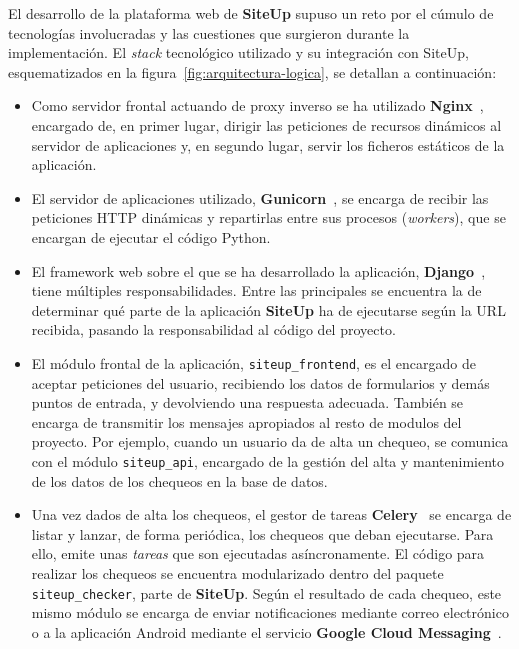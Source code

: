 \documentclass[a4paper,12pt]{article}
\begin{document}
El desarrollo de la plataforma web de \textbf{SiteUp} supuso un reto por el
cúmulo de tecnologías involucradas y las cuestiones que surgieron durante la
implementación. El \textit{stack} tecnológico utilizado y su integración con
SiteUp, esquematizados en la figura~\ref{fig:arquitectura-logica}, se detallan a
continuación:

\begin{itemize}
\item Como servidor frontal actuando de proxy inverso se ha utilizado
  \textbf{Nginx}~\cite{nginx}, encargado de, en primer lugar, dirigir las peticiones de
  recursos dinámicos al servidor de aplicaciones y, en segundo lugar, servir los
  ficheros estáticos de la aplicación.

\item El servidor de aplicaciones utilizado, \textbf{Gunicorn}~\cite{gunicorn},
  se encarga de recibir las peticiones HTTP dinámicas y repartirlas entre sus
  procesos (\textit{workers}), que se encargan de ejecutar el código Python.

\item El framework web sobre el que se ha desarrollado la aplicación,
  \textbf{Django}~\cite{django}, tiene múltiples responsabilidades. Entre las
  principales se encuentra la de determinar qué parte de la aplicación
  \textbf{SiteUp} ha de ejecutarse según la URL recibida, pasando la
  responsabilidad al código del proyecto.

\item El módulo frontal de la aplicación, \texttt{siteup\_frontend}, es el
  encargado de aceptar peticiones del usuario, recibiendo los datos de
  formularios y demás puntos de entrada, y devolviendo una respuesta
  adecuada. También se encarga de transmitir los mensajes apropiados al resto de
  modulos del proyecto. Por ejemplo, cuando un usuario da de alta un chequeo, se
  comunica con el módulo \texttt{siteup\_api}, encargado de la gestión del alta
  y mantenimiento de los datos de los chequeos en la base de datos. 

\item Una vez dados de alta los chequeos, el gestor de tareas
  \textbf{Celery}~\cite{celery} se encarga de listar y lanzar, de forma
  periódica, los chequeos que deban ejecutarse. Para ello, emite unas
  \textit{tareas} que son ejecutadas asíncronamente. El código para realizar los
  chequeos se encuentra modularizado dentro del paquete
  \texttt{siteup\_checker}, parte de \textbf{SiteUp}. Según el resultado de cada
  chequeo, este mismo módulo se encarga de enviar notificaciones mediante correo
  electrónico o a la aplicación Android mediante el servicio \textbf{Google
    Cloud Messaging}~\cite{gcm}.

\end{itemize}
\end{document}

